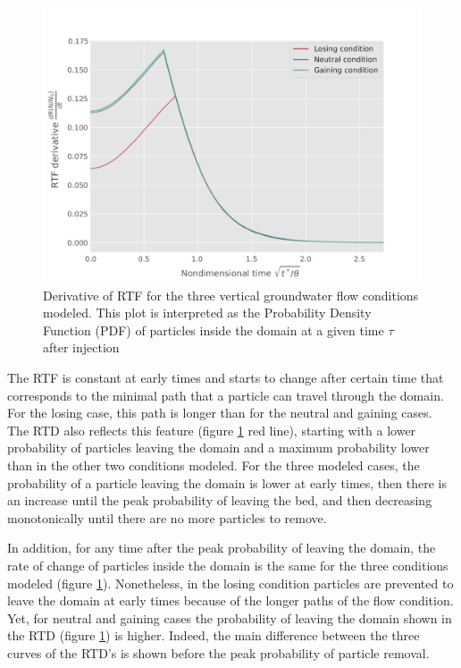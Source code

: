 \documentclass[draft,linenumbers]{agujournal2018}
\begin{document}
\begin{figure}[ht]
\centering
\includegraphics[trim=0.2cm 0.2cm 0.2cm 0.2cm, width=35pc]
{190131_RTF_der.pdf}
\caption{Derivative of RTF for the three vertical groundwater flow conditions modeled. This plot is interpreted as the Probability Density Function (PDF) of particles inside the domain at a given time $\tau$ after injection}
\label{RTFder}
\end{figure}

The RTF is constant at early times and starts to change after certain time that corresponds to the minimal path that a particle can travel through the domain. For the losing case, this path is longer than for the neutral and gaining cases. The RTD also reflects this feature (figure \ref{RTFder} red line), starting with a lower probability of particles leaving the domain and a maximum probability lower than in the other two conditions modeled. For the three modeled cases, the probability of a particle leaving the domain is lower at early times, then there is an increase until the peak probability of leaving the bed, and then decreasing monotonically until there are no more particles to remove.

In addition, for any time after the peak probability of leaving the domain, the rate of change of particles inside the domain is the same for the three conditions modeled (figure \ref{RTFder}). Nonetheless, in the losing condition particles are prevented to leave the domain at early times because of the longer paths of the flow condition. Yet, for neutral and gaining cases the probability of leaving the domain shown in the RTD (figure \ref{RTFder}) is higher. Indeed, the main difference between the three curves of the RTD's is shown before the peak probability of particle removal. 
\end{document}
